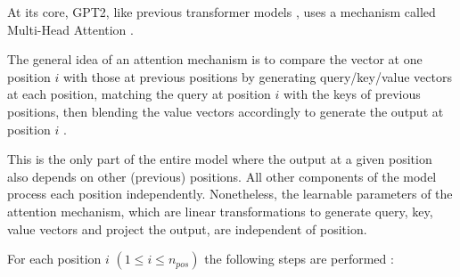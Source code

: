 At its core, GPT2, like previous transformer models , uses a mechanism called Multi-Head Attention .

The general idea of an attention mechanism is to compare the vector at one position $i$ with those at previous positions by generating query/key/value vectors at each position, matching the query at position $i$ with the keys of previous positions, then blending the value vectors accordingly to generate the output at position $i$ \cite{alammar-transformer} \cite{alammar-gpt2}.

This is the only part of the entire model where the output at a given position also depends on other (previous) positions. All other components of the model process each position independently.
Nonetheless, the learnable parameters of the attention mechanism, which are linear transformations to generate query, key, value vectors and project the output, are independent of position.


For each position $i$ $(1 \leq i \leq n_{pos})$ the following steps are performed  \cite{alammar-transformer} \cite{alammar-gpt2}:


